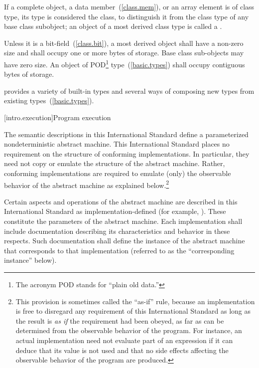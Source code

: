 \pnum
If a complete object, a data member~(\ref{class.mem}), or an array element is of
class type, its type is considered the 
class, to distinguish it from the class type of any base class subobject;
an object of a most derived class type is called a
.

\pnum
{}%
Unless it is a bit-field~(\ref{class.bit}), a most derived object shall have a
non-zero size and shall occupy one or more bytes of storage. Base class
sub-objects may have zero size. An object of POD\footnote{The acronym POD stands for ``plain old data.''}
type~(\ref{basic.types}) shall occupy contiguous bytes of
storage.

\pnum
\enternote 
\Cpp  provides a variety of built-in types and several ways of composing
new types from existing types~(\ref{basic.types}).
\exitnote%

[intro.execution]{Program execution}

\pnum
{}%
%
The semantic descriptions in this International Standard define a
parameterized nondeterministic abstract machine. This International
Standard places no requirement on the structure of conforming
implementations. In particular, they need not copy or emulate the
structure of the abstract machine.
%
%
Rather, conforming implementations are required to emulate (only) the observable
behavior of the abstract machine as explained below.\footnote{This provision is
sometimes called the ``as-if'' rule, because an implementation is free to
disregard any requirement of this International Standard as long as the result
is \emph{as if} the requirement had been obeyed, as far as can be determined
from the observable behavior of the program. For instance, an actual
implementation need not evaluate part of an expression if it can deduce that its
value is not used and that no
%
side effects affecting the
observable behavior of the program are produced.}

%
\pnum
Certain aspects and operations of the abstract machine are described in this
International Standard as implementation-defined (for example,
). These constitute the parameters of the abstract machine.
Each implementation shall include documentation describing its characteristics
and behavior in these respects. Such documentation shall define the instance of the
abstract machine that corresponds to that implementation (referred to as the
``corresponding instance'' below).

